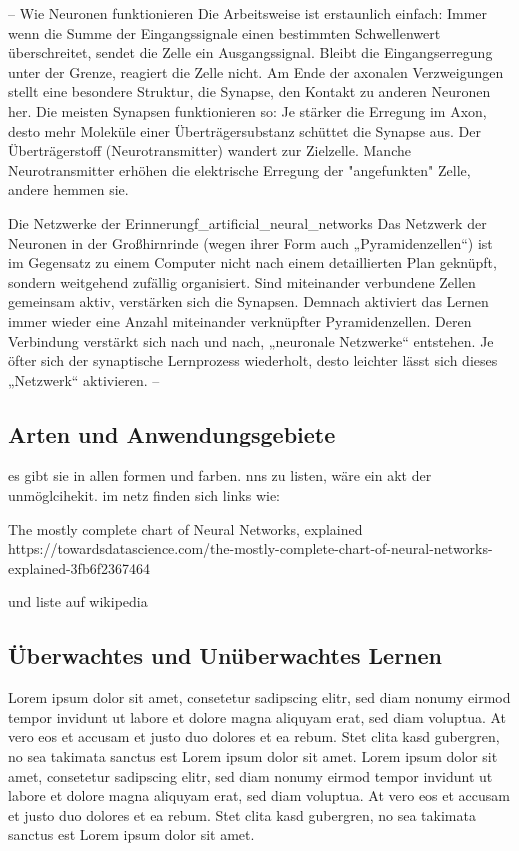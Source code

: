 --
Wie Neuronen funktionieren
Die Arbeitsweise ist erstaunlich einfach:
Immer wenn die Summe der Eingangssignale einen bestimmten Schwellenwert überschreitet,
sendet die Zelle ein Ausgangssignal.
Bleibt die Eingangserregung unter der Grenze, reagiert die Zelle nicht.
Am Ende der axonalen Verzweigungen stellt eine besondere Struktur, die Synapse,
den Kontakt zu anderen Neuronen her.
Die meisten Synapsen funktionieren so:
Je stärker die Erregung im Axon, desto mehr Moleküle einer Überträgersubstanz
schüttet die Synapse aus. Der Überträgerstoff (Neurotransmitter) wandert zur Zielzelle.
Manche Neurotransmitter erhöhen die elektrische Erregung der "angefunkten" Zelle,
andere hemmen sie. 

Die Netzwerke der Erinnerungf_artificial_neural_networks
Das Netzwerk der Neuronen in der Großhirnrinde (wegen ihrer Form auch „Pyramidenzellen“)
ist im Gegensatz zu einem Computer nicht nach einem detaillierten Plan geknüpft,
sondern weitgehend zufällig organisiert.
Sind miteinander verbundene Zellen gemeinsam aktiv, verstärken sich die Synapsen.
Demnach aktiviert das Lernen immer wieder eine Anzahl miteinander verknüpfter
Pyramidenzellen. Deren Verbindung verstärkt sich nach und nach,
„neuronale Netzwerke“ entstehen.
Je öfter sich der synaptische Lernprozess wiederholt, desto leichter
lässt sich dieses „Netzwerk“ aktivieren. 
--

\subsection{Arten und Anwendungsgebiete}

es gibt sie in allen formen und farben. nns zu listen, wäre ein akt der unmöglcihekit. 
im netz finden sich links wie:

The mostly complete chart of Neural Networks, explained
https://towardsdatascience.com/the-mostly-complete-chart-of-neural-networks-explained-3fb6f2367464

und
liste auf wikipedia


\subsection{Überwachtes und Unüberwachtes Lernen}
Lorem ipsum dolor sit amet, consetetur sadipscing elitr, sed diam nonumy eirmod tempor invidunt ut labore et dolore magna aliquyam erat, sed diam voluptua. At vero eos et accusam et justo duo dolores et ea rebum. Stet clita kasd gubergren, no sea takimata sanctus est Lorem ipsum dolor sit amet. Lorem ipsum dolor sit amet, consetetur sadipscing elitr, sed diam nonumy eirmod tempor invidunt ut labore et dolore magna aliquyam erat, sed diam voluptua. At vero eos et accusam et justo duo dolores et ea rebum. Stet clita kasd gubergren, no sea takimata sanctus est Lorem ipsum dolor sit amet.

